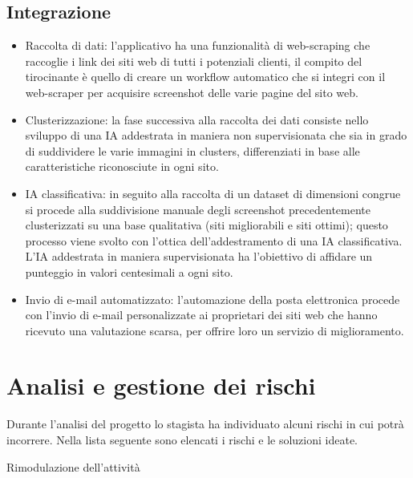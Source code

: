 \subsection{Integrazione}
\begin{itemize}
    \item Raccolta di dati: l'applicativo ha una funzionalità di web-scraping che raccoglie i link dei siti web di tutti i potenziali clienti, il compito del tirocinante è quello di creare un workflow automatico che si integri con il web-scraper per acquisire screenshot delle varie pagine del sito web. 
    \item Clusterizzazione: la fase successiva alla raccolta dei dati consiste nello sviluppo di una IA addestrata in maniera non supervisionata che sia in grado di suddividere le varie immagini in clusters, differenziati in base alle caratteristiche riconosciute in ogni sito. 
    \item IA classificativa: in seguito alla raccolta di un dataset di dimensioni congrue si procede alla suddivisione manuale degli screenshot precedentemente clusterizzati su una base qualitativa (siti migliorabili e siti ottimi); questo processo viene svolto con l'ottica dell'addestramento di una IA classificativa.
    L'IA addestrata in maniera supervisionata ha l'obiettivo di affidare un punteggio in valori centesimali a ogni sito. 
    \item Invio di e-mail automatizzato: l'automazione della posta elettronica procede con l'invio di e-mail personalizzate ai proprietari dei siti web che hanno ricevuto una valutazione scarsa, per offrire loro un servizio di miglioramento.
\end{itemize}

\section{Analisi e gestione dei rischi}
Durante l'analisi del progetto lo stagista ha individuato alcuni rischi in cui potrà incorrere.
Nella lista seguente sono elencati i rischi e le soluzioni ideate.\\

\begin{risk}{Rimodulazione dell'attività}
    \label{risk: tempistiche ristrette} 
\end{risk}

